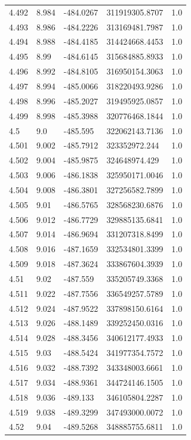 \begin{tabular}{lllll}
4.492 & 8.984 & -484.0267 & 311919305.8707 & 1.0 \\
4.493 & 8.986 & -484.2226 & 313169481.7987 & 1.0 \\
4.494 & 8.988 & -484.4185 & 314424668.4453 & 1.0 \\
4.495 & 8.99 & -484.6145 & 315684885.8933 & 1.0 \\
4.496 & 8.992 & -484.8105 & 316950154.3063 & 1.0 \\
4.497 & 8.994 & -485.0066 & 318220493.9286 & 1.0 \\
4.498 & 8.996 & -485.2027 & 319495925.0857 & 1.0 \\
4.499 & 8.998 & -485.3988 & 320776468.1844 & 1.0 \\
4.5 & 9.0 & -485.595 & 322062143.7136 & 1.0 \\
4.501 & 9.002 & -485.7912 & 323352972.244 & 1.0 \\
4.502 & 9.004 & -485.9875 & 324648974.429 & 1.0 \\
4.503 & 9.006 & -486.1838 & 325950171.0046 & 1.0 \\
4.504 & 9.008 & -486.3801 & 327256582.7899 & 1.0 \\
4.505 & 9.01 & -486.5765 & 328568230.6876 & 1.0 \\
4.506 & 9.012 & -486.7729 & 329885135.6841 & 1.0 \\
4.507 & 9.014 & -486.9694 & 331207318.8499 & 1.0 \\
4.508 & 9.016 & -487.1659 & 332534801.3399 & 1.0 \\
4.509 & 9.018 & -487.3624 & 333867604.3939 & 1.0 \\
4.51 & 9.02 & -487.559 & 335205749.3368 & 1.0 \\
4.511 & 9.022 & -487.7556 & 336549257.5789 & 1.0 \\
4.512 & 9.024 & -487.9522 & 337898150.6164 & 1.0 \\
4.513 & 9.026 & -488.1489 & 339252450.0316 & 1.0 \\
4.514 & 9.028 & -488.3456 & 340612177.4933 & 1.0 \\
4.515 & 9.03 & -488.5424 & 341977354.7572 & 1.0 \\
4.516 & 9.032 & -488.7392 & 343348003.6661 & 1.0 \\
4.517 & 9.034 & -488.9361 & 344724146.1505 & 1.0 \\
4.518 & 9.036 & -489.133 & 346105804.2287 & 1.0 \\
4.519 & 9.038 & -489.3299 & 347493000.0072 & 1.0 \\
4.52 & 9.04 & -489.5268 & 348885755.6811 & 1.0 \\

\end{tabular}
